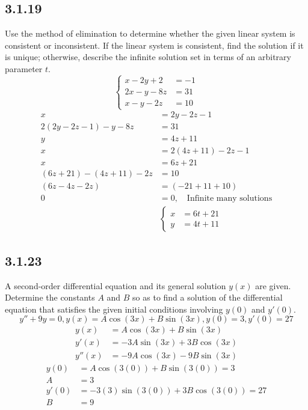 \documentclass{article}
\begin{document}
\subsection{3.1.19}
Use the method of elimination to determine whether the given linear system is consistent or inconsistent. If the linear system is consistent, find the solution if it is unique; otherwise, describe the infinite solution set in terms of an arbitrary parameter $ t $.
\begin{equation*}
	\left\{
		\begin{aligned}
			x - 2y + 2 & = -1 \\
			2x - y - 8z & = 31 \\
			x - y - 2z & = 10
		\end{aligned}
	\right.
\end{equation*}
\begin{align*}
	x & = 2y - 2z - 1 \\
	2(2y - 2z - 1) - y - 8z & = 31 \\
	y & = 4z + 11 \\
	x & = 2(4z + 11) - 2z - 1 \\
	x & = 6z + 21 \\
	(6z + 21) - (4z + 11) - 2z & = 10 \\
	(6z - 4z - 2z) & = (-21 + 11 + 10) \\
	0 & = 0, \quad \text{Infinite many solutions} \\
	  & \left\{
		\begin{aligned}
			x & = 6t + 21 \\
			y & = 4t + 11
		\end{aligned}
	\right.
\end{align*}

\subsection{3.1.23}
A second-order differential equation and its general solution $ y(x) $ are given. Determine the constants $ A $ and $ B $ so as to find a solution of the differential equation that satisfies the given initial conditions involving $ y(0) $ and $ y'(0) $.
$$ y'' + 9y = 0, y(x) = A\cos(3x) + B\sin(3x), y(0) = 3, y'(0) = 27 $$
\begin{align*}
	y(x) & = A\cos(3x) + B\sin(3x) \\
	y'(x) & = -3A\sin(3x) + 3B\cos(3x) \\
	y''(x) & = -9A\cos(3x) - 9B\sin(3x)
\end{align*}
\begin{align*}
	y(0) & = A\cos(3(0)) + B\sin(3(0)) = 3 \\
	A & = 3 \\
	y'(0) & = -3(3)\sin(3(0)) + 3B\cos(3(0)) = 27 \\
	B & = 9
\end{align*}
\end{document}
